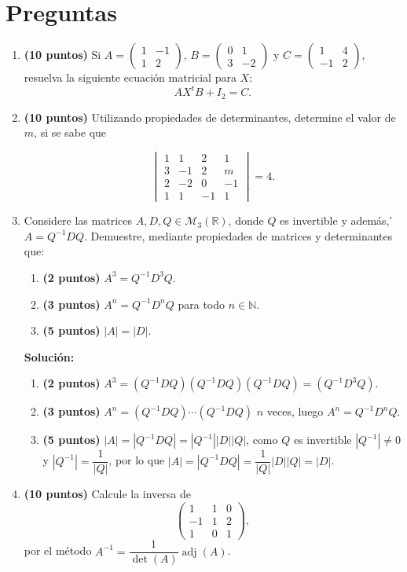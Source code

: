 \documentclass[a4paper]{article}
\begin{document}
\section*{Preguntas}
\begin{enumerate}


\item {\bf (10 puntos)} Si $A=\begin{pmatrix} 1 & -1 \\ 1 & 2 \end{pmatrix}$, $B=\begin{pmatrix} 0 & 1 \\ 3 & -2 \end{pmatrix}$ y $C=\begin{pmatrix} 1 & 4 \\ -1 & 2 \end{pmatrix}$, resuelva la siguiente ecuación matricial para $X$:
    \[AX^tB+I_2=C.\]
    

    
\newpage

\newpage
\item {\bf (10 puntos)} Utilizando propiedades de determinantes, determine el valor de $m$, si se sabe que 

\[\begin{vmatrix} 1 & 1  & 2 & 1 \\ 3 & -1 & 2& m\\ 2 & -2 & 0& -1\\ 1 & 1 & -1 &  1  \end{vmatrix}=4. \]

   \newpage 
       \item  Considere las matrices $A,D,Q \in \mathcal{M}_3(\mathbb{R})$, donde $Q$ es invertible y además,  ́$ A = Q^{-1}DQ$. Demuestre, mediante propiedades de matrices y determinantes que:

\begin{enumerate}
    \item {\bf (2 puntos)} $A^3=Q^{-1}D^3Q$.
    \item {\bf (3 puntos)} $A^n=Q^{-1}D^nQ$ para todo $n\in \mathbb{N}$.
    \item {\bf (5 puntos)} $|A|=|D|$.
\end{enumerate}
\textbf{Soluci\'on:}
\begin{enumerate}
    \item {\bf (2 puntos)} $A^3=(Q^{-1}DQ)(Q^{-1}DQ)(Q^{-1}DQ)=(Q^{-1}D^3Q)$.
    \item {\bf (3 puntos)} $A^n=(Q^{-1}DQ)\cdots (Q^{-1}DQ)$ $n$ veces, luego $A^n=Q^{-1}D^nQ$.
    \item {\bf (5 puntos)} $|A|=|Q^{-1}DQ|=|Q^{-1}| |D| |Q|$, como $Q$ es invertible $|Q^{-1}|\neq 0$ y $|Q^{-1}|=\dfrac{1}{|Q|}$, por lo que $|A|=|Q^{-1}DQ|=\dfrac{1}{|Q|} |D| |Q|=|D|$.
\end{enumerate}
\newpage
    \item {\bf (10 puntos)} Calcule la inversa de
\[\begin{pmatrix} 1 & 1  & 0  \\ -1 & 1 & 2\\ 1 & 0 & 1 \end{pmatrix}, \]
por el m\'etodo $A^{-1}=\dfrac{1}{\det(A)}\operatorname{adj}(A)$.
    \newpage
\newpage


\end{enumerate}
\end{document}
